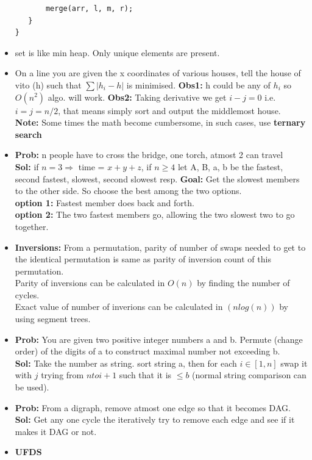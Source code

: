 \documentclass[8pt, a4paper, oneside, twocolumn]{extarticle}
\begin{document}
\begin{itemize}
\begin{verbatim}
       merge(arr, l, m, r);
   }
}
    \end{verbatim}
    \item set is like min heap. Only unique elements are present.
    \item On a line you are given the x coordinates of various houses, tell the house of vito (h) such that $\sum |h_i - h|$ is minimised. \textbf{Obs1: } h could be any of $h_i$ so $O(n^2)$ algo. will work. \textbf{Obs2: } Taking derivative we get $i - j = 0$ i.e. $i = j = n/2$, that means simply sort and output the middlemost house.\\
    \textbf{Note: }Some times the math become cumbersome, in such cases, use \textbf{ternary search}
    \item \textbf{Prob: }n people have to cross the bridge, one torch, atmost 2 can travel\\
    \textbf{Sol: }if $n = 3 \Rightarrow$ time = $x + y + z$, if $n \geq 4$ let A, B, a, b be the fastest, second fastest, slowest, second slowest resp. \textbf{Goal: }Get the slowest members to the other side. So choose the best among the two options.\\\textbf{option 1: }Fastest member does back and forth.\\\textbf{option 2: }The two fastest members go, allowing the two slowest two to go together.
    \item \textbf{Inversions: }From a permutation, parity of number of swaps needed to get to the identical permutation is same as parity of inversion count of this permutation.
    \\Parity of inversions can be calculated in $O(n)$ by finding the number of cycles.
    \\Exact value of number of inverions can be calculated in $(nlog(n))$ by using segment trees.
    \item \textbf{Prob: }You are given two positive integer numbers a and b. Permute (change order) of the digits of a to construct maximal number not exceeding b.
    \\\textbf{Sol: }Take the number as string. sort string a, then for each $i \in [1, n]$ swap it with $j$ trying from $n to i + 1$ such that it is $\leq b$ (normal string comparison can be used).
    \item \textbf{Prob: }From a digraph, remove atmost one edge so that it becomes DAG.
    \\\textbf{Sol: }Get any one cycle the iteratively try to remove each edge and see if it makes it DAG or not.
    \item \textbf{UFDS}

\end{itemize}
\end{document}
